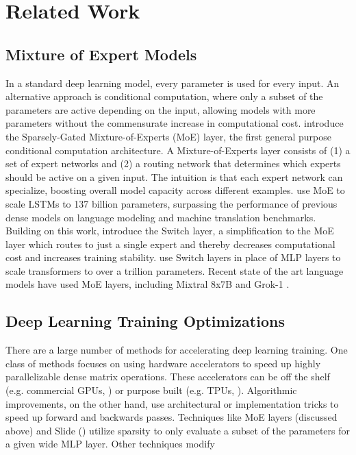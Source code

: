 \documentclass{article} %
\begin{document}
\section{Related Work}

\subsection{Mixture of Expert Models}
In a standard deep learning model, every parameter is used for every input. An alternative approach is conditional computation, where only a subset of the parameters are active depending on the input, allowing models with more parameters without the commensurate increase in computational cost. \cite{shazeer2017outrageously} introduce the Sparsely-Gated Mixture-of-Experts (MoE) layer, the first general purpose conditional computation architecture. A Mixture-of-Experts layer consists of (1) a set of expert networks and (2) a routing network that determines which experts should be active on a given input. 
The intuition is that each expert network can specialize, boosting overall model capacity across different examples. \cite{shazeer2017outrageously} use MoE to scale LSTMs to 137 billion parameters, surpassing the performance of previous dense models on language modeling and machine translation benchmarks. Building on this work, \cite{fedus2022switch} introduce the Switch layer, a simplification to the MoE layer which routes to just a single expert and thereby decreases computational cost and increases training stability. \cite{fedus2022switch} use Switch layers in place of MLP layers to scale transformers to over a trillion parameters. Recent state of the art language models have used MoE layers, including Mixtral 8x7B \citep {jiang2024mixtral} and Grok-1 \citep{grokmodelcard}.

\subsection{Deep Learning Training Optimizations}
There are a large number of methods for accelerating deep learning training. One class of methods focuses on using hardware accelerators to speed up highly parallelizable dense matrix operations. These accelerators can be off the shelf (e.g. commercial GPUs, \citep{raina2009large}) or purpose built (e.g. TPUs, \citep{jouppi2017datacenter}). Algorithmic improvements, on the other hand, use architectural or implementation tricks to speed up forward and backwards passes.  Techniques like MoE layers (discussed above) and Slide (\citep{chen2020slide}) utilize sparsity to only evaluate a subset of the parameters for a given wide MLP layer. Other techniques modify 
\end{document}
